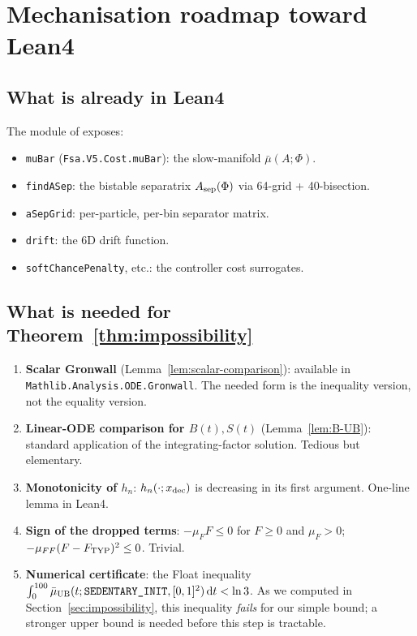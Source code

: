 \documentclass[11pt,a4paper]{article}
\theoremstyle{definition}
\newcommand{\dd}{\,\mathrm{d}}
\begin{document}
\section{Mechanisation roadmap toward Lean4} \label{sec:lean}

\subsection{What is already in Lean4}

The  module of  exposes:

\begin{itemize}
  \item \texttt{muBar} (\texttt{Fsa.V5.Cost.muBar}): the slow-manifold $\bar\mu(A; \Phi)$.
  \item \texttt{findASep}: the bistable separatrix $A_{\rm sep}(\Phi)$ via 64-grid + 40-bisection.
  \item \texttt{aSepGrid}: per-particle, per-bin separator matrix.
  \item \texttt{drift}: the 6D drift function.
  \item \texttt{softChancePenalty}, etc.: the controller cost surrogates.
\end{itemize}

\subsection{What is needed for Theorem~\ref{thm:impossibility}}

\begin{enumerate}
  \item \textbf{Scalar Gronwall} (Lemma~\ref{lem:scalar-comparison}): available in \texttt{Mathlib.Analysis.ODE.Gronwall}. The needed form is the inequality version, not the equality version.
  \item \textbf{Linear-ODE comparison for $B(t), S(t)$} (Lemma~\ref{lem:B-UB}): standard application of the integrating-factor solution. Tedious but elementary.
  \item \textbf{Monotonicity of $h_n$}: $h_n(\cdot; x_{\rm dec})$ is decreasing in its first argument. One-line lemma in Lean4.
  \item \textbf{Sign of the dropped terms}: $-\mu_F F \le 0$ for $F \ge 0$ and $\mu_F > 0$; $-\mu_{FF}(F - F_{\rm TYP})^2 \le 0$. Trivial.
  \item \textbf{Numerical certificate}: the Float inequality $\int_0^{100} \bar\mu_{\rm UB}(t; \texttt{SEDENTARY\_INIT}, [0,1]^2) \dd t < \ln 3$. As we computed in Section~\ref{sec:impossibility}, this inequality \emph{fails} for our simple bound; a stronger upper bound is needed before this step is tractable.
\end{enumerate}
\end{document}
